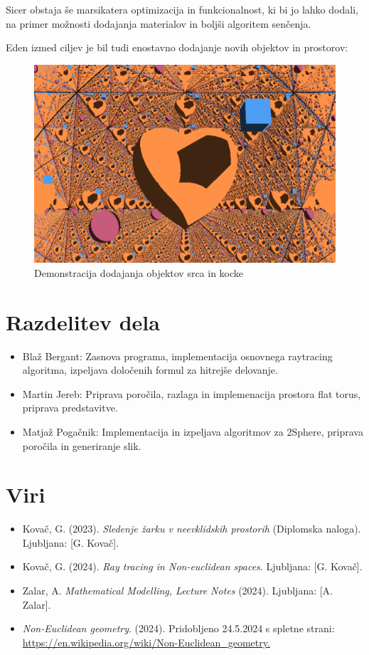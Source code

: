 \documentclass[titlepage]{article}
\begin{document}
Sicer obstaja še marsikatera optimizacija in funkcionalnost, ki bi jo lahko dodali,
na primer možnosti dodajanja materialov in boljši algoritem senčenja.

Eden izmed ciljev je bil tudi enostavno dodajanje novih objektov in prostorov:

\begin{figure} [H]
  \centering
  \includegraphics[width=0.9\linewidth]{Images/Flat_torus_24mm_heart_cube.png}
  \caption{Demonstracija dodajanja objektov srca in kocke}
  \label{fig:Flat_torus_heart}
\end{figure}







\section{Razdelitev dela}
\begin{itemize}
  \item Blaž Bergant: Zasnova programa, implementacija osnovnega raytracing algoritma, izpeljava določenih formul za hitrejše delovanje.
  \item Martin Jereb: Priprava poročila, razlaga in implemenacija prostora flat torus, priprava predstavitve.
\item Matjaž Pogačnik: Implementacija in izpeljava algoritmov za 2Sphere, priprava poročila in generiranje slik.
\end{itemize}

\section{Viri}
\begin{itemize}
  \item Kovač, G. (2023). \textit{Sledenje žarku v neevklidskih prostorih} (Diplomska naloga). Ljubljana: [G. Kovač].
  \item Kovač, G. (2024). \textit{Ray tracing in Non-euclidean spaces}. Ljubljana: [G. Kovač].
  \item Zalar, A. \textit{Mathematical Modelling, Lecture Notes} (2024). Ljubljana: [A. Zalar].
  \item \textit{Non-Euclidean geometry}. (2024). Pridobljeno 24.5.2024 s spletne strani: \url{https://en.wikipedia.org/wiki/Non-Euclidean_geometry.}
\end{itemize}
\end{document}
